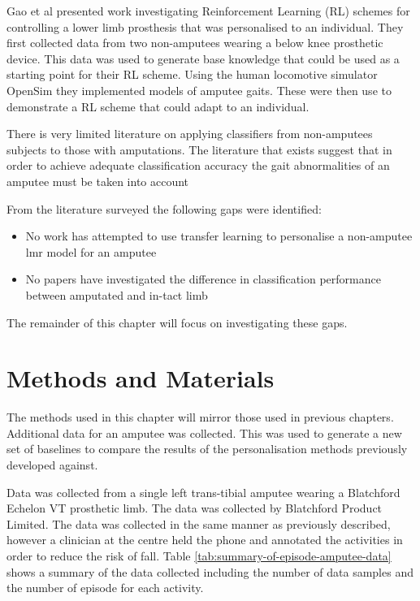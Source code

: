 Gao et al presented work investigating Reinforcement Learning (RL) schemes for controlling a lower limb prosthesis that was personalised to an individual. They first collected data from two non-amputees wearing a below knee prosthetic device. This data was used to generate base knowledge that could be used as a starting point for their RL scheme. Using the human locomotive simulator OpenSim they implemented models of amputee gaits. These were then use to demonstrate a RL scheme that could adapt to an individual.\cite{Gao2020a}

There is very limited literature on applying classifiers from non-amputees subjects to those with amputations. The literature that exists suggest that in order to achieve adequate classification accuracy the gait abnormalities of an amputee must be taken into account

From the literature surveyed the following gaps were identified:
\begin{itemize}
    \item No work has attempted to use transfer learning to personalise a non-amputee \acrshort{lmr} model for an amputee
    \item No papers have investigated the difference in classification performance between amputated and in-tact limb
\end{itemize}

The remainder of this chapter will focus on investigating these gaps.

\section{Methods and Materials}
\label{sec:amputee-methods}
The methods used in this chapter will mirror those used in previous chapters. Additional data for an amputee was collected. This was used to generate a new set of baselines to compare the results of the personalisation methods previously developed against.

Data was collected from a single left trans-tibial amputee wearing a Blatchford Echelon VT prosthetic limb. The data was collected by Blatchford Product Limited. The data was collected in the same manner as previously described, however a clinician at the centre held the phone and annotated the activities in order to reduce the risk of fall. Table \ref{tab:summary-of-episode-amputee-data} shows a summary of the data collected including the number of data samples and the number of episode for each activity.

